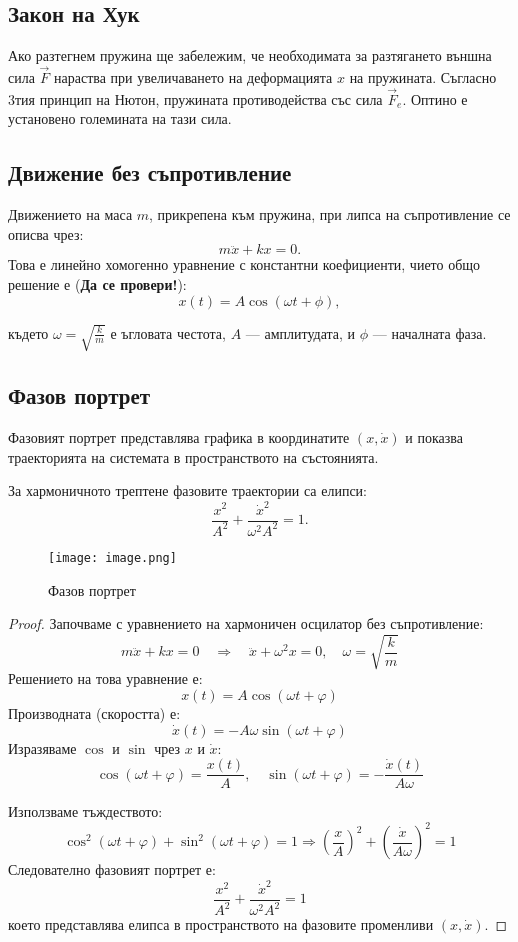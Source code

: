 \documentclass{report}
\begin{document}
\subsection{Закон на Хук}
Ако разтегнем пружина ще забележим, че необходимата за разтягането външна сила $\vec F$ нараства при увеличаването на деформацията $x$ на пружината. 
Съгласно 3тия принцип на Нютон, пружината противодейства със сила $\vec F_e$. Оптино е установено големината на тази сила.
\subsection{Движение без съпротивление}
Движението на маса $m$, прикрепена към пружина, при липса на съпротивление се описва чрез:
\[
m \ddot{x} + kx = 0.
\]
Това е линейно хомогенно уравнение с константни коефициенти, чието общо решение е (\textbf{Да се провери!}):
\[
x(t) = A \cos(\omega t + \phi),
\]

където $\omega = \sqrt{\frac{k}{m}}$ е ъгловата честота, $A$ — амплитудата, и $\phi$ — началната фаза.

\subsection{Фазов портрет}
Фазовият портрет представлява графика в координатите $(x, \dot{x})$ и показва траекторията на системата в пространството на състоянията.

За хармоничното трептене фазовите траектории са елипси:
\[
\frac{x^2}{A^2} + \frac{\dot{x}^2}{\omega^2 A^2} = 1.
\]
\begin{wrapfigure}{r}{0.4\textwidth}
    \centering
    \texttt{[image: image.png]}
    \caption{Фазов портрет}
\end{wrapfigure}
\begin{proof}
    Започваме с уравнението на хармоничен осцилатор без съпротивление:
\[
m\ddot{x} + kx = 0 \quad \Rightarrow \quad \ddot{x} + \omega^2 x = 0, \quad \omega = \sqrt{\frac{k}{m}}
\]
Решението на това уравнение е:
\[
x(t) = A \cos(\omega t + \varphi)
\]
Производната (скоростта) е:
\[
\dot{x}(t) = -A\omega \sin(\omega t + \varphi)
\]
Изразяваме $\cos$ и $\sin$ чрез $x$ и $\dot{x}$:
\[
\cos(\omega t + \varphi) = \frac{x(t)}{A}, \quad \sin(\omega t + \varphi) = -\frac{\dot{x}(t)}{A\omega}
\]

Използваме тъждеството:
\[
\cos^2(\omega t + \varphi) + \sin^2(\omega t + \varphi) = 1
\Rightarrow \left(\frac{x}{A}\right)^2 + \left(\frac{\dot{x}}{A\omega}\right)^2 = 1
\]
Следователно фазовият портрет е:
\[
\frac{x^2}{A^2} + \frac{\dot{x}^2}{\omega^2 A^2} = 1
\]
което представлява елипса в пространството на фазовите променливи $(x, \dot{x})$.
\end{proof}
\end{document}
